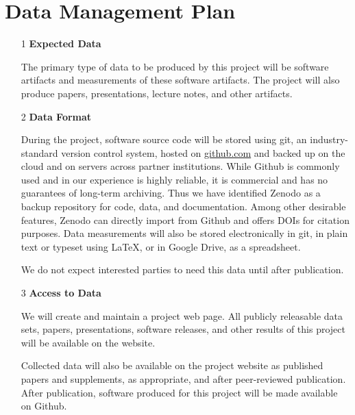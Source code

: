 


\section*{Data Management Plan}

\label{sec:datamgmt}

\begin{enumerate}
\item [1] \textbf{Expected Data}

The primary type of data to be produced by this project will be
software artifacts and measurements of these software artifacts.
The project will also produce papers, presentations, lecture notes,
and other artifacts.
\item [2] \textbf{Data Format}

During the project, software source code will be stored using git, an industry-standard
version control system, hosted on \url{github.com} and
backed up on the cloud and
on servers across partner institutions. While Github is commonly used and in our experience is highly reliable, it is commercial and has no guarantees of long-term archiving. Thus we have identified Zenodo as a backup repository for code, data, and documentation. Among other desirable features, Zenodo can directly import from Github and offers DOIs for citation purposes.
%
Data measurements
will also be stored electronically in git,
in plain text or typeset using \LaTeX, or in Google
Drive, as a spreadsheet.

We do not expect interested parties to need this data until after publication.

\item [3] \textbf{Access to Data}

We will create and maintain a project web page. %
All publicly releasable data sets,
papers, presentations, software releases, and other results of this
project will be available on the website.

Collected data will also be available on the project website as published
papers and supplements, as appropriate, and after peer-reviewed
publication.
After publication, software produced for this project will be
made available on Github.



\end{enumerate}
